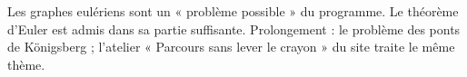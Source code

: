 \begin{teachernote}
Les graphes eulériens sont un « problème possible » du programme. Le théorème d'Euler est admis dans sa partie suffisante. Prolongement : le problème des ponts de Königsberg ; l'atelier « Parcours sans lever le crayon » du site traite le même thème.
\end{teachernote}

